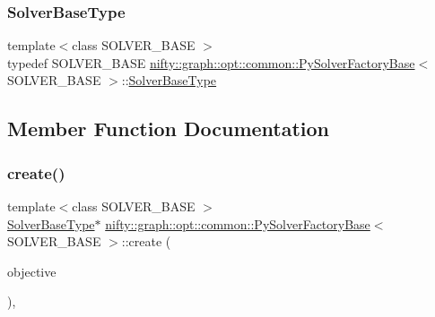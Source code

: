 \subsubsection{\texorpdfstring{Solver\+Base\+Type}{SolverBaseType}}
{\footnotesize\ttfamily template$<$class S\+O\+L\+V\+E\+R\+\_\+\+B\+A\+SE $>$ \\
typedef S\+O\+L\+V\+E\+R\+\_\+\+B\+A\+SE \hyperlink{classnifty_1_1graph_1_1opt_1_1common_1_1PySolverFactoryBase}{nifty\+::graph\+::opt\+::common\+::\+Py\+Solver\+Factory\+Base}$<$ S\+O\+L\+V\+E\+R\+\_\+\+B\+A\+SE $>$\+::\hyperlink{classnifty_1_1graph_1_1opt_1_1common_1_1SolverFactoryBase_a83f347591f4cffa7afb13c8f495dcce2}{Solver\+Base\+Type}}



\subsection{Member Function Documentation}
\mbox{\label{classnifty_1_1graph_1_1opt_1_1common_1_1PySolverFactoryBase_a4d2362161eba8c351f771687f8bbbe87}} 
\subsubsection{\texorpdfstring{create()}{create()}}
{\footnotesize\ttfamily template$<$class S\+O\+L\+V\+E\+R\+\_\+\+B\+A\+SE $>$ \\
\hyperlink{classnifty_1_1graph_1_1opt_1_1common_1_1SolverFactoryBase_a83f347591f4cffa7afb13c8f495dcce2}{Solver\+Base\+Type}$\ast$ \hyperlink{classnifty_1_1graph_1_1opt_1_1common_1_1PySolverFactoryBase}{nifty\+::graph\+::opt\+::common\+::\+Py\+Solver\+Factory\+Base}$<$ S\+O\+L\+V\+E\+R\+\_\+\+B\+A\+SE $>$\+::create (\begin{DoxyParamCaption}\item[{const \hyperlink{classnifty_1_1graph_1_1opt_1_1common_1_1SolverFactoryBase_ab71d93640cf3fbc0bc980450d5db6e45}{Objective\+Type} \&}]{objective }\end{DoxyParamCaption})\hspace{0.3cm}{\ttfamily [inline]}, {\ttfamily [virtual]}}



